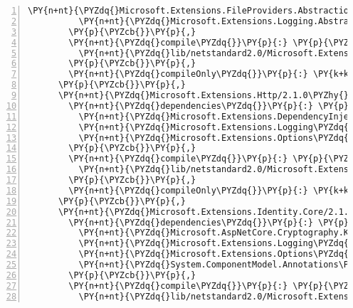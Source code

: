 \begin{Verbatim}[commandchars=\\\{\},numbers=left,firstnumber=1,stepnumber=1,numberblanklines=0]
          \PY{n+nt}{\PYZdq{}Microsoft.Extensions.FileProviders.Abstractions\PYZdq{}}\PY{p}{:} \PY{l+s+s2}{\PYZdq{}2.1.0\PYZhy{}rc1\PYZhy{}final\PYZdq{}}\PY{p}{,}
          \PY{n+nt}{\PYZdq{}Microsoft.Extensions.Logging.Abstractions\PYZdq{}}\PY{p}{:} \PY{l+s+s2}{\PYZdq{}2.1.0\PYZhy{}rc1\PYZhy{}final\PYZdq{}}
        \PY{p}{\PYZcb{}}\PY{p}{,}
        \PY{n+nt}{\PYZdq{}compile\PYZdq{}}\PY{p}{:} \PY{p}{\PYZob{}}
          \PY{n+nt}{\PYZdq{}lib/netstandard2.0/Microsoft.Extensions.Hosting.Abstractions.dll\PYZdq{}}\PY{p}{:} \PY{p}{\PYZob{}}\PY{p}{\PYZcb{}}
        \PY{p}{\PYZcb{}}\PY{p}{,}
        \PY{n+nt}{\PYZdq{}compileOnly\PYZdq{}}\PY{p}{:} \PY{k+kc}{true}
      \PY{p}{\PYZcb{}}\PY{p}{,}
      \PY{n+nt}{\PYZdq{}Microsoft.Extensions.Http/2.1.0\PYZhy{}rc1\PYZhy{}final\PYZdq{}}\PY{p}{:} \PY{p}{\PYZob{}}
        \PY{n+nt}{\PYZdq{}dependencies\PYZdq{}}\PY{p}{:} \PY{p}{\PYZob{}}
          \PY{n+nt}{\PYZdq{}Microsoft.Extensions.DependencyInjection.Abstractions\PYZdq{}}\PY{p}{:} \PY{l+s+s2}{\PYZdq{}2.1.0\PYZhy{}rc1\PYZhy{}final\PYZdq{}}\PY{p}{,}
          \PY{n+nt}{\PYZdq{}Microsoft.Extensions.Logging\PYZdq{}}\PY{p}{:} \PY{l+s+s2}{\PYZdq{}2.1.0\PYZhy{}rc1\PYZhy{}final\PYZdq{}}\PY{p}{,}
          \PY{n+nt}{\PYZdq{}Microsoft.Extensions.Options\PYZdq{}}\PY{p}{:} \PY{l+s+s2}{\PYZdq{}2.1.0\PYZhy{}rc1\PYZhy{}final\PYZdq{}}
        \PY{p}{\PYZcb{}}\PY{p}{,}
        \PY{n+nt}{\PYZdq{}compile\PYZdq{}}\PY{p}{:} \PY{p}{\PYZob{}}
          \PY{n+nt}{\PYZdq{}lib/netstandard2.0/Microsoft.Extensions.Http.dll\PYZdq{}}\PY{p}{:} \PY{p}{\PYZob{}}\PY{p}{\PYZcb{}}
        \PY{p}{\PYZcb{}}\PY{p}{,}
        \PY{n+nt}{\PYZdq{}compileOnly\PYZdq{}}\PY{p}{:} \PY{k+kc}{true}
      \PY{p}{\PYZcb{}}\PY{p}{,}
      \PY{n+nt}{\PYZdq{}Microsoft.Extensions.Identity.Core/2.1.0\PYZhy{}rc1\PYZhy{}final\PYZdq{}}\PY{p}{:} \PY{p}{\PYZob{}}
        \PY{n+nt}{\PYZdq{}dependencies\PYZdq{}}\PY{p}{:} \PY{p}{\PYZob{}}
          \PY{n+nt}{\PYZdq{}Microsoft.AspNetCore.Cryptography.KeyDerivation\PYZdq{}}\PY{p}{:} \PY{l+s+s2}{\PYZdq{}2.1.0\PYZhy{}rc1\PYZhy{}final\PYZdq{}}\PY{p}{,}
          \PY{n+nt}{\PYZdq{}Microsoft.Extensions.Logging\PYZdq{}}\PY{p}{:} \PY{l+s+s2}{\PYZdq{}2.1.0\PYZhy{}rc1\PYZhy{}final\PYZdq{}}\PY{p}{,}
          \PY{n+nt}{\PYZdq{}Microsoft.Extensions.Options\PYZdq{}}\PY{p}{:} \PY{l+s+s2}{\PYZdq{}2.1.0\PYZhy{}rc1\PYZhy{}final\PYZdq{}}\PY{p}{,}
          \PY{n+nt}{\PYZdq{}System.ComponentModel.Annotations\PYZdq{}}\PY{p}{:} \PY{l+s+s2}{\PYZdq{}4.5.0\PYZhy{}rc1\PYZdq{}}
        \PY{p}{\PYZcb{}}\PY{p}{,}
        \PY{n+nt}{\PYZdq{}compile\PYZdq{}}\PY{p}{:} \PY{p}{\PYZob{}}
          \PY{n+nt}{\PYZdq{}lib/netstandard2.0/Microsoft.Extensions.Identity.Core.dll\PYZdq{}}\PY{p}{:} \PY{p}{\PYZob{}}\PY{p}{\PYZcb{}}

\end{Verbatim}
